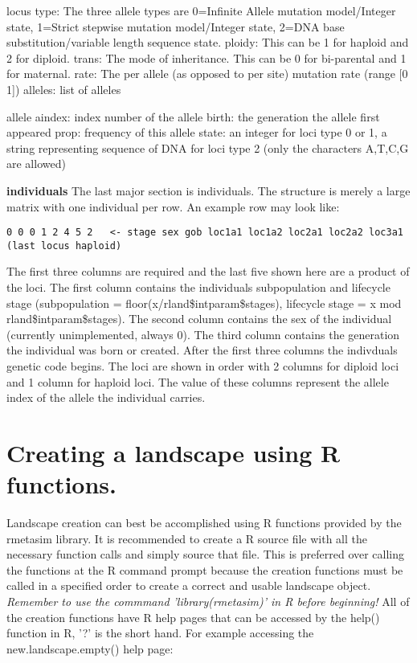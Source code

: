 \documentclass{article}
\begin{document}
\begin{list}{}{\setlength{\labelsep}{10pt} \setlength{\leftmargin}{40pt}}
locus
type: The three allele types are 0=Infinite Allele mutation model/Integer state, 1=Strict stepwise mutation model/Integer state, 2=DNA base substitution/variable length sequence state.
ploidy: This can be 1 for haploid and 2 for diploid.
trans: The mode of inheritance.  This can be 0 for bi-parental and 1 for maternal.
rate: The per allele (as opposed to per site) mutation rate (range [0 1])
alleles: list of alleles

allele
aindex: index number of the allele
birth: the generation the allele first appeared
prop: frequency of this allele
state: an integer for loci type 0 or 1, a string representing sequence of DNA for loci type 2 (only the characters A,T,C,G are allowed)

\item[\textbf{individuals}] The last major section is individuals. The structure is merely a large matrix with one individual per row. An example row may look like:

\begin{verbatim}
0 0 0 1 2 4 5 2   <- stage sex gob loc1a1 loc1a2 loc2a1 loc2a2 loc3a1 (last locus haploid)
\end{verbatim}

The first three columns are required and the last five shown here are a product of the loci.  The first column contains the individuals subpopulation and lifecycle stage (subpopulation = floor(x/rland\$intparam\$stages), lifecycle stage = x mod rland\$intparam\$stages).  The second column contains the sex of the individual (currently unimplemented, always 0).  The third column contains the generation the individual was born or created.  After the first three columns the indivduals genetic code begins.  The loci are shown in order with 2 columns for diploid loci and 1 column for haploid loci.  The value of these columns represent the allele index of the allele the individual carries.

\end{list}

\section{Creating a landscape using R functions.}
Landscape creation can best be accomplished using R functions provided by the rmetasim library.  It is recommended to create a R source file with all the necessary function calls and simply source that file.  This is preferred over calling the functions at the R command prompt because the creation functions must be called in a specified order to create a correct and usable landscape object.
\textit{Remember to use the commmand 'library(rmetasim)' in R before beginning!}
All of the creation functions have R help pages that can be accessed by the help() function in R, '?' is the short hand.  For example accessing the new.landscape.empty() help page:
\end{document}
